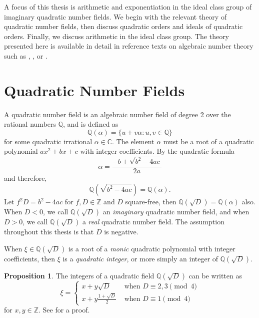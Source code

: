 \documentclass{ucalgthes1}
\theoremstyle{definition}
\newtheorem{prop}[thm]{Proposition}
\newcommand{\CC}{\mathbb{C}}
\newcommand{\ZZ}{\mathbb{Z}}
\newcommand{\QQ}{\mathbb{Q}}
\begin{document}

A focus of this thesis is arithmetic and exponentiation in the ideal class group of imaginary quadratic number fields.  We begin with the relevant theory of quadratic number fields, then discuss quadratic orders and ideals of quadratic orders.  Finally, we discuss arithmetic in the ideal class group.  The theory presented here is available in detail in reference texts on algebraic number theory such as \cite{Cohn1980}, \cite{Hua2012}, or \cite{Ireland1990}. 


\section{Quadratic Number Fields}

A quadratic number field is an algebraic number field of degree 2 over the rational numbers $\QQ$, and is defined as
\[
	\QQ(\alpha) = \{u + v\alpha : u,v \in \QQ\}
\]
for some quadratic irrational $\alpha \in \CC$.  The element $\alpha$ must be a root of a quadratic polynomial $ax^2 + bx + c$ with integer coefficients.  By the quadratic formula
\[
	\alpha = \frac{-b \pm \sqrt{b^2 - 4ac}}{2a}
\]
and therefore,
\[
	\QQ(\sqrt{b^2-4ac}) = \QQ(\alpha).
\]
Let $f^2 D = b^2-4ac$ for $f, D \in \ZZ$ and $D$ square-free, then $\QQ(\sqrt D) = \QQ(\alpha)$ also.  When $D < 0$, we call $\QQ(\sqrt D)$ an \emph{imaginary} quadratic number field, and when $D > 0$, we call $\QQ(\sqrt D)$ a \emph{real} quadratic number field.  The assumption throughout this thesis is that $D$ is negative.

When $\xi \in \QQ(\sqrt D)$ is a root of a \emph{monic} quadratic polynomial with integer coefficients, then $\xi$ is a \emph{quadratic integer}, or more simply an integer of $\QQ(\sqrt D)$.

\begin{prop}
\label{prop:quadInts}
\cite[Proposition 13.1.1]{Ireland1990} The integers of a quadratic field $\QQ(\sqrt D)$ can be written as
\begin{equation*}
\xi = \begin{cases}
	x + y \sqrt D & \textrm{ when } D \equiv 2, 3 \pmod 4 \\
	x + y \frac{1 + \sqrt D}{2} & \textrm{ when } D \equiv 1 \pmod 4
	\end{cases}
\end{equation*}
for $x, y \in \ZZ$.  See \cite[p.189]{Ireland1990} for a proof.
\end{prop}
\end{document}
